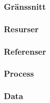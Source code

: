 \subsubsection{Gränssnitt}

\subsubsection{Resurser}

\subsubsection{Referenser}

\subsubsection{Process}

\subsubsection{Data}
